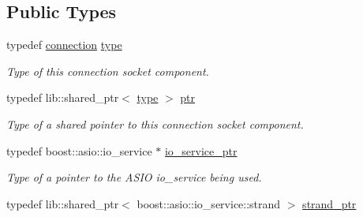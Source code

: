 \subsection*{Public Types}
\begin{DoxyCompactItemize}
\item 
typedef \hyperlink{classwebsocketpp_1_1transport_1_1asio_1_1basic__socket_1_1connection}{connection} \hyperlink{classwebsocketpp_1_1transport_1_1asio_1_1basic__socket_1_1connection_a449a7d627f3e231de1f25668b544478a}{type}\hypertarget{classwebsocketpp_1_1transport_1_1asio_1_1basic__socket_1_1connection_a449a7d627f3e231de1f25668b544478a}{}\label{classwebsocketpp_1_1transport_1_1asio_1_1basic__socket_1_1connection_a449a7d627f3e231de1f25668b544478a}

\begin{DoxyCompactList}\small\item\em Type of this connection socket component. \end{DoxyCompactList}\item 
typedef lib\+::shared\+\_\+ptr$<$ \hyperlink{classwebsocketpp_1_1transport_1_1asio_1_1basic__socket_1_1connection_a449a7d627f3e231de1f25668b544478a}{type} $>$ \hyperlink{classwebsocketpp_1_1transport_1_1asio_1_1basic__socket_1_1connection_a1a4fa6887235c53c7ddd13307798b280}{ptr}\hypertarget{classwebsocketpp_1_1transport_1_1asio_1_1basic__socket_1_1connection_a1a4fa6887235c53c7ddd13307798b280}{}\label{classwebsocketpp_1_1transport_1_1asio_1_1basic__socket_1_1connection_a1a4fa6887235c53c7ddd13307798b280}

\begin{DoxyCompactList}\small\item\em Type of a shared pointer to this connection socket component. \end{DoxyCompactList}\item 
typedef boost\+::asio\+::io\+\_\+service $\ast$ \hyperlink{classwebsocketpp_1_1transport_1_1asio_1_1basic__socket_1_1connection_a2fbedcf43a5be7b7e4abda534828260b}{io\+\_\+service\+\_\+ptr}\hypertarget{classwebsocketpp_1_1transport_1_1asio_1_1basic__socket_1_1connection_a2fbedcf43a5be7b7e4abda534828260b}{}\label{classwebsocketpp_1_1transport_1_1asio_1_1basic__socket_1_1connection_a2fbedcf43a5be7b7e4abda534828260b}

\begin{DoxyCompactList}\small\item\em Type of a pointer to the A\+S\+IO io\+\_\+service being used. \end{DoxyCompactList}\item 
typedef lib\+::shared\+\_\+ptr$<$ boost\+::asio\+::io\+\_\+service\+::strand $>$ \hyperlink{classwebsocketpp_1_1transport_1_1asio_1_1basic__socket_1_1connection_a5476ae9ce5c53ecb57a3dfd8326f4f33}{strand\+\_\+ptr}\hypertarget{classwebsocketpp_1_1transport_1_1asio_1_1basic__socket_1_1connection_a5476ae9ce5c53ecb57a3dfd8326f4f33}{}\label{classwebsocketpp_1_1transport_1_1asio_1_1basic__socket_1_1connection_a5476ae9ce5c53ecb57a3dfd8326f4f33}


\end{DoxyCompactItemize}
